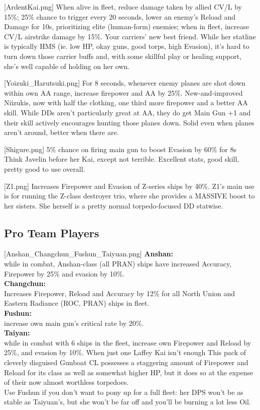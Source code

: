 [ArdentKai.png]
{When alive in fleet, reduce damage taken by allied CV/L by 15\%; 25\% chance to trigger every 20 seconds, lower an enemy's Reload and Damage for 10s, prioritizing elite (human-form) enemies; when in fleet, increase CV/L airstrike damage by 15\%.}
{}
{Your carriers' new best friend. While her statline is typically HMS (ie. low HP, okay guns, good torps, high Evasion), it's hard to turn down those carrier buffs and, with some skillful play or healing support, she's well capable of holding on her own.}

[Yoizuki_Harutsuki.png]
{For 8 seconds, whenever enemy planes are shot down within own AA range, increase firepower and AA by 25\%.}
{}
{New-and-improved Niizukis, now with half the clothing, one third more firepower and a better AA skill. While DDs aren't particularly great at AA, they do get Main Gun +1 and their skill actively encourages hunting those planes down. Solid even when planes aren't around, better when there are.}

[Shigure.png]
{5\% chance on firing main gun to boost Evasion by 60\% for 8s}
{}
{Think Javelin before her Kai, except not terrible. Excellent stats, good skill, pretty good to use overall.}
 
[Z1.png]
{Increases Firepower and Evasion of Z-series ships by 40\%.}
{}
{Z1's main use is for running the Z-class destroyer trio, where she provides a MASSIVE boost to her sisters. She herself is a pretty normal torpedo-focused DD statwise.}
\vspace{10em}
 
\newpage
\subsection{ Pro Team Players}

[Anshan_Changchun_Fushun_Taiyuan.png]
{\textbf{Anshan:}\\
    while in combat, Anshan-class (all PRAN) ships have increased Accuracy, Firepower by 25\% and evasion by 10\%.\\
    \textbf{Changchun:}\\
    Increases Firepower, Reload and Accuracy by 12\% for all North Union and Eastern Radiance (ROC, PRAN) ships in fleet.\\
    \textbf{Fushun:}\\
    increase own main gun's critical rate by 20\%.\\
    \textbf{Taiyan:}\\
    while in combat with 6 ships in the fleet, increase own Firepower and Reload by 25\%, and evasion by 10\%.}
{When just one Laffey Kai isn't enough}
{This pack of cleverly disguised Gunboat CL possesses a staggering amount of Firepower and Reload for its class as well as somewhat higher HP, but it does so at the expense of their now almost worthless torpedoes.\\
Use Fushun if you don't want to pony up for a full fleet: her DPS won't be as stable as Taiyuan's, but she won't be far off and you'll be burning a lot less Oil.}

